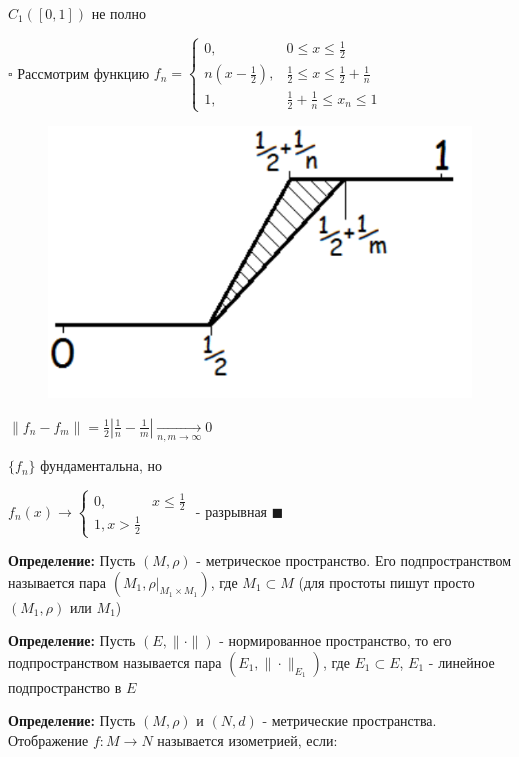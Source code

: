 \documentclass[a4paper]{report}
\begin{document}
$C_1([0,1])$ не полно

$\square$ Рассмотрим функцию $f_n=\begin{cases}0,&0\le x\le\frac12\\n(x-\frac12),&\frac12\le x\le\frac12+\frac1n\\1,&\frac12+\frac1n\le x_n\le1\end{cases}$

\begin{figure} 
\includegraphics[width=\linewidth]{2}
\end{figure}

\noindent
$\|f_n-f_m\|=\frac12|\frac1n-\frac1m|\xrightarrow[n,m\to\infty]{}0$ 

\noindent
$\{f_n\}$ фундаментальна, но 

$f_n(x)\to\begin{cases}0,&x\le\frac12\\1,x>\frac12\end{cases}$ - разрывная $\blacksquare$

\bigskip
\bigskip
\bigskip
\noindent\textbf{Определение:} Пусть $(M,\rho)$ - метрическое пространство. Его подпространством называется пара $(M_1,\rho|_{M_1\times M_1})$, 
где $M_1\subset M$ (для простоты пишут просто $(M_1,\rho)$ или $M_1$)
\bigskip

\noindent\textbf{Определение:} Пусть $(E,\|\cdot\|)$ -  нормированное пространство, то его подпространством называется пара 
$(E_1,\|\cdot\|_{E_1})$, где $E_1\subset E$, $E_1$ - линейное подпространство в $E$ 
\bigskip

\noindent\textbf{Определение:} Пусть $(M,\rho)$ и $(N,d)$ - метрические пространства. Отображение $f\colon M\to N$ называется
изометрией, если:
\end{document}
